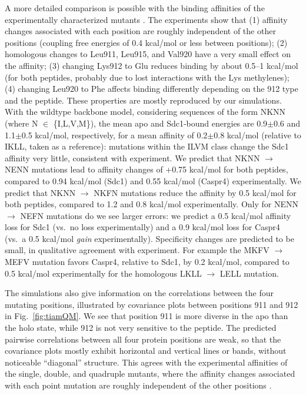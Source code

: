 \documentclass[12pt]{article}
\begin{document}
A more detailed comparison is possible with the binding affinities of the experimentally characterized mutants \cite{Sheperd11}.
The experiments show that (1) affinity changes associated with each position are roughly independent of the other positions (coupling
free energies of 0.4 kcal/mol or less between positions); (2) homologous changes to Leu911, Leu915, and Val920 have a very small
effect on the affinity; (3) changing Lys912 to Glu reduces binding by about 0.5--1 kcal/mol (for both peptides, probably due to lost
interactions with the Lys methylenes); (4) changing Leu920 to Phe affects binding differently depending on the 912 type and the peptide.
These properties are mostly reproduced by our simulations. With the wildtype backbone model, considering sequences of the form NKNN
(where N $\in$ \{I,L,V,M\}), the mean apo and Sdc1-bound energies are 0.9$\pm$0.6 and 1.1$\pm$0.5 kcal/mol, respectively, for a mean
affinity  of 0.2$\pm$0.8 kcal/mol (relative to IKLL, taken as a reference): mutations within the ILVM class change the Sdc1 affinity
very little, consistent with experiment. We predict that NKNN $\rightarrow$ NENN mutations lead to affinity changes of +0.75 kcal/mol
for both peptides, compared to 0.94 kcal/mol (Sdc1) and 0.55 kcal/mol (Caspr4) experimentally. We predict that NKNN $\rightarrow$ NKFN
mutations reduce the affinity by 0.5 kcal/mol for both peptides, compared to 1.2 and 0.8 kcal/mol experimentally. Only for NENN
$\rightarrow$ NEFN mutations do we see larger errors: we predict a 0.5 kcal/mol affinity loss for Sdc1 (vs.\ no loss experimentally)
and a 0.9 kcal/mol loss for Caspr4 (vs.\ a 0.5 kcal/mol {\it gain} experimentally). Specificity changes are predicted to be small,
in qualitative agreement with experiment. For example the MKFV $\rightarrow$ MEFV mutation favors Caspr4, relative to Sdc1, by 0.2
kcal/mol, compared to 0.5 kcal/mol experimentally for the homologous LKLL $\rightarrow$ LELL mutation.

The simulations also give information on the correlations between the four mutating positions, illustrated by covariance plots
between positions 911 and 912 in Fig.\ \ref{fig:tiamQM}. We see that position 911 is more diverse in the apo than the holo state,
while 912 is not very sensitive to the peptide. The predicted pairwise correlations between all four protein positions are weak,
so that the covariance plots mostly exhibit horizontal and vertical lines or bands, without noticeable ``diagonal'' structure.
This agrees with the experimental affinities of the single, double, and quadruple mutants, where the affinity changes associated
with each point mutation are roughly independent of the other positions \cite{Sheperd11}. 
\end{document}
